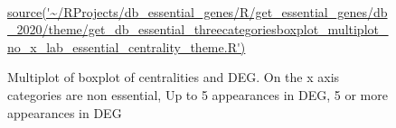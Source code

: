 ﻿%
﻿
﻿\begin{figure}[p]
    \vspace*{-2cm}
    \caption{Multiplot of boxplot of centralities and DEG. On the x axis categories are non essential, Up to 5 appearances in DEG, 5 or more appearances in DEG }
    \label{sec:multiplot of boxplot of centralities and DEG}
    \tiny\url{ source('~/RProjects/db_essential_genes/R/get_essential_genes/db_2020/theme/get_db_essential_threecategoriesboxplot_multiplot_no_x_lab_essential_centrality_theme.R')}
\end{figure}
